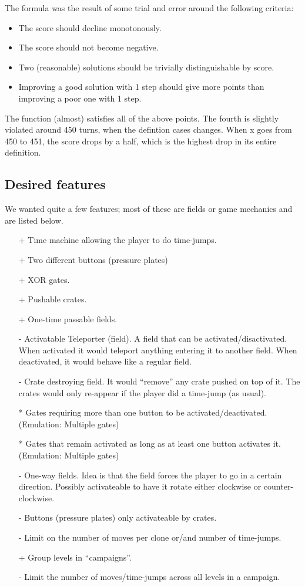The formula was the result of some trial and error around the following
criteria:

\begin{itemize}
\item The score should decline monotonously.
\item The score should not become negative.
\item Two (reasonable) solutions should be trivially distinguishable by score.
\item Improving a good solution with 1 step should give more points
  than improving a poor one with 1 step.
\end{itemize}

The function (almost) satisfies all of the above points.  The fourth
is slightly violated around 450 turns, when the defintion cases
changes.  When x goes from 450 to 451, the score drops by a half,
which is the highest drop in its entire definition.

\subsection{Desired features}
We wanted quite a few features; most of these are fields or game
mechanics and are listed below.

\begin{itemize}
\item[+] Time machine allowing the player to do time-jumps.
\item[+] Two different buttons (pressure plates)
\item[+] XOR gates.
\item[+] Pushable crates.
\item[+] One-time passable fields.
\item[-] Activatable Teleporter (field).  A field that can be
  activated/disactivated.  When activated it would teleport anything
  entering it to another field.  When deactivated, it would behave
  like a regular field.
\item[-] Crate destroying field.  It would ``remove'' any crate pushed
  on top of it.  The crates would only re-appear if the player did a
  time-jump (as usual).
\item[*] Gates requiring more than one button to be activated/deactivated.
 (Emulation: Multiple gates)
\item[*] Gates that remain activated as long as at least one button activates
 it.  (Emulation: Multiple gates)
\item[-] One-way fields.  Idea is that the field forces the player to go
 in a certain direction.  Possibly activateable to have it rotate either
 clockwise or counter-clockwise.
\item[-] Buttons (pressure plates) only activateable by crates.
\item[-] Limit on the number of moves per clone or/and number of time-jumps.
\item[+] Group levels in ``campaigns''.
\item[-] Limit the number of moves/time-jumps across all levels in a campaign.
\end{itemize}


